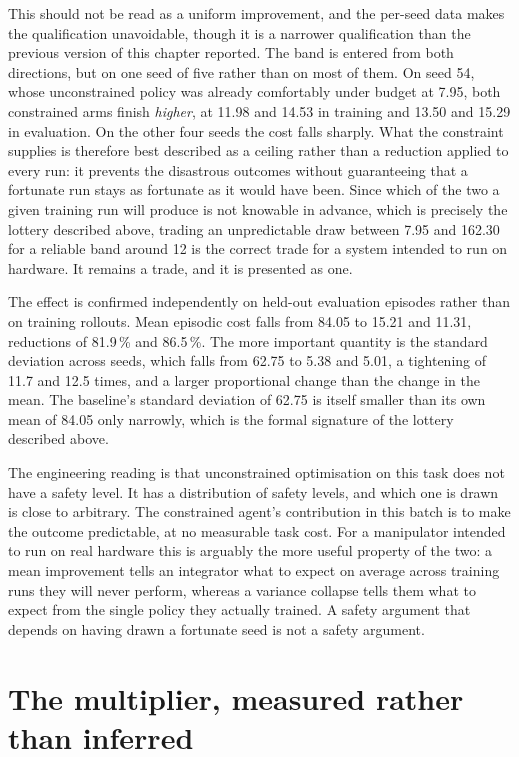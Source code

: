 This should not be read as a uniform improvement, and the per-seed data makes the qualification
unavoidable, though it is a narrower qualification than the previous version of this chapter
reported. The band is entered from both directions, but on one seed of five rather than on most
of them. On seed 54, whose unconstrained policy was already comfortably under budget at 7.95, both
constrained arms finish \emph{higher}, at 11.98 and 14.53 in training and 13.50 and 15.29 in
evaluation. On the other four seeds the cost falls sharply. What the constraint supplies is
therefore best described as a ceiling rather than a reduction applied to every run: it prevents
the disastrous outcomes without guaranteeing that a fortunate run stays as fortunate as it would
have been. Since which of the two a given training run will produce is not knowable in advance,
which is precisely the lottery described above, trading an unpredictable draw between 7.95 and
162.30 for a reliable band around 12 is the correct trade for a system intended to run on
hardware. It remains a trade, and it is presented as one.

The effect is confirmed independently on held-out evaluation episodes rather than on training
rollouts. Mean episodic cost falls from 84.05 to 15.21 and 11.31, reductions of 81.9\,\% and
86.5\,\%. The more important quantity is the standard deviation across seeds, which falls from
62.75 to 5.38 and 5.01, a tightening of 11.7 and 12.5 times, and a larger proportional change
than the change in the mean. The baseline's standard deviation of 62.75 is itself smaller than
its own mean of 84.05 only narrowly, which is the formal signature of the lottery described above.

The engineering reading is that unconstrained optimisation on this task does not have a safety
level. It has a distribution of safety levels, and which one is drawn is close to arbitrary. The
constrained agent's contribution in this batch is to make the outcome predictable, at no
measurable task cost. For a manipulator intended to run on real hardware this is arguably the
more useful property of the two: a mean improvement tells an integrator what to expect on average
across training runs they will never perform, whereas a variance collapse tells them what to
expect from the single policy they actually trained. A safety argument that depends on having
drawn a fortunate seed is not a safety argument.

\section{The multiplier, measured rather than inferred}\label{sec:r-lambda}

